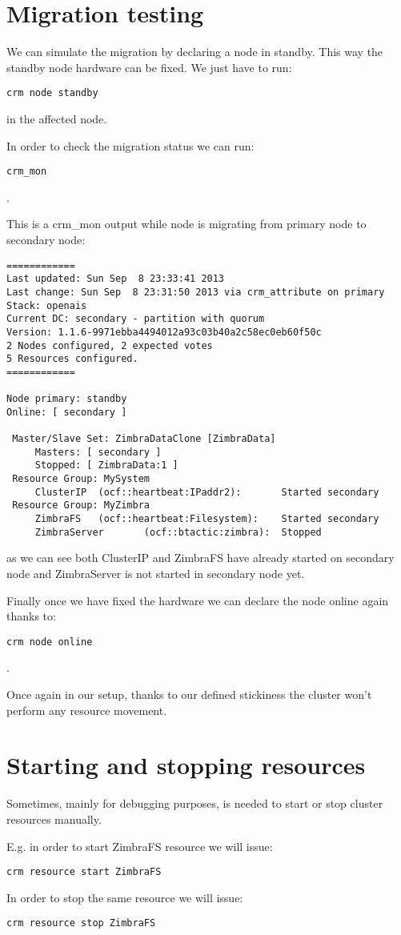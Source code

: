 \section {Migration testing}
We can simulate the migration by declaring a node in standby. This way the standby node hardware can be fixed. We just have to run:
\begin{verbatim}
crm node standby
\end{verbatim}
in the affected node.

In order to check the migration status we can run:
\begin{verbatim}
crm_mon
\end{verbatim}
.

This is a crm\_mon output while node is migrating from primary node to secondary node:
\begin{verbatim}
============
Last updated: Sun Sep  8 23:33:41 2013
Last change: Sun Sep  8 23:31:50 2013 via crm_attribute on primary
Stack: openais
Current DC: secondary - partition with quorum
Version: 1.1.6-9971ebba4494012a93c03b40a2c58ec0eb60f50c
2 Nodes configured, 2 expected votes
5 Resources configured.
============

Node primary: standby
Online: [ secondary ]

 Master/Slave Set: ZimbraDataClone [ZimbraData]
     Masters: [ secondary ]
     Stopped: [ ZimbraData:1 ]
 Resource Group: MySystem
     ClusterIP  (ocf::heartbeat:IPaddr2):       Started secondary
 Resource Group: MyZimbra
     ZimbraFS   (ocf::heartbeat:Filesystem):    Started secondary
     ZimbraServer       (ocf::btactic:zimbra):  Stopped

\end{verbatim}
as we can see both ClusterIP and ZimbraFS have already started on secondary node and ZimbraServer is not started in secondary node yet.


Finally once we have fixed the hardware we can declare the node online again thanks to:
\begin{verbatim}
crm node online
\end{verbatim}
.

Once again in our setup, thanks to our defined stickiness the cluster won't perform any resource movement.

\section {Starting and stopping resources}
Sometimes, mainly for debugging purposes, is needed to start or stop cluster resources manually.

E.g. in order to start ZimbraFS resource we will issue:
\begin{verbatim}
crm resource start ZimbraFS
\end{verbatim}
In order to stop the same resource we will issue:
\begin{verbatim}
crm resource stop ZimbraFS
\end{verbatim}

